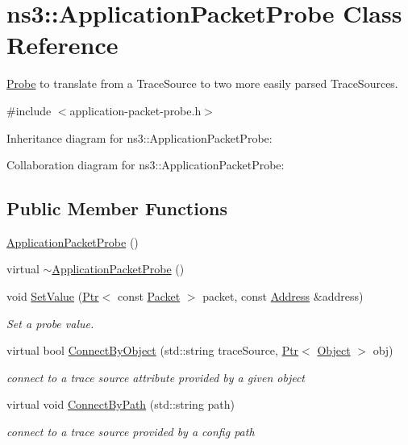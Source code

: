 \hypertarget{classns3_1_1ApplicationPacketProbe}{}\section{ns3\+:\+:Application\+Packet\+Probe Class Reference}
\label{classns3_1_1ApplicationPacketProbe}


\hyperlink{classns3_1_1Probe}{Probe} to translate from a Trace\+Source to two more easily parsed Trace\+Sources.  




{\ttfamily \#include $<$application-\/packet-\/probe.\+h$>$}



Inheritance diagram for ns3\+:\+:Application\+Packet\+Probe\+:


Collaboration diagram for ns3\+:\+:Application\+Packet\+Probe\+:
\subsection*{Public Member Functions}
\begin{DoxyCompactItemize}
\item 
\hyperlink{classns3_1_1ApplicationPacketProbe_a90cdd24ca948f7c96754c385c988ea76}{Application\+Packet\+Probe} ()
\item 
virtual \hyperlink{classns3_1_1ApplicationPacketProbe_a29bcada55934b2bbba6c3deb1cf53b92}{$\sim$\+Application\+Packet\+Probe} ()
\item 
void \hyperlink{classns3_1_1ApplicationPacketProbe_a5bc61678ff902643522c271caa054434}{Set\+Value} (\hyperlink{classns3_1_1Ptr}{Ptr}$<$ const \hyperlink{classns3_1_1Packet}{Packet} $>$ packet, const \hyperlink{classns3_1_1Address}{Address} \&address)
\begin{DoxyCompactList}\small\item\em Set a probe value. \end{DoxyCompactList}\item 
virtual bool \hyperlink{classns3_1_1ApplicationPacketProbe_a9f2ee434c1e2aa67a3da20c4c44eccc7}{Connect\+By\+Object} (std\+::string trace\+Source, \hyperlink{classns3_1_1Ptr}{Ptr}$<$ \hyperlink{classns3_1_1Object}{Object} $>$ obj)
\begin{DoxyCompactList}\small\item\em connect to a trace source attribute provided by a given object \end{DoxyCompactList}\item 
virtual void \hyperlink{classns3_1_1ApplicationPacketProbe_a0752c9821f165dea42c7d79080d16825}{Connect\+By\+Path} (std\+::string path)
\begin{DoxyCompactList}\small\item\em connect to a trace source provided by a config path \end{DoxyCompactList}\end{DoxyCompactItemize}
